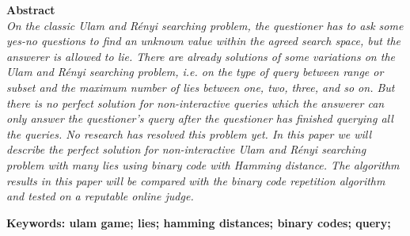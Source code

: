 \noindent\textbf{\large Abstract} \\
\itshape
On the classic Ulam and Rényi searching problem, the questioner has to ask some yes-no questions to find an unknown value within the agreed search space, but the answerer is allowed to lie. There are already solutions of some variations on the Ulam and Rényi searching problem, i.e. on the type of query between range or subset and the maximum number of lies between one, two, three, and so on. But there is no perfect solution for non-interactive queries which the answerer can only answer the questioner's query after the questioner has finished querying all the queries. No research has resolved this problem yet. In this paper we will describe the perfect solution for non-interactive Ulam and Rényi searching problem with many lies using binary code with Hamming distance. The algorithm results in this paper will be compared with the binary code repetition algorithm and tested on a reputable online judge.

\vspace*{1em}
\noindent\bfseries Keywords: ulam game; lies; hamming distances; binary codes; query;
\normalfont
\cleardoublepage